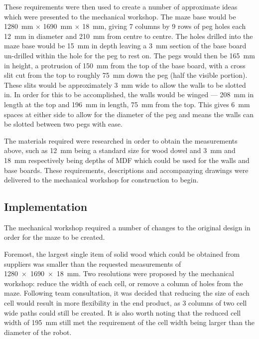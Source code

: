 These requirements were then used to create a number of approximate ideas which
were presented to the mechanical workshop. The maze base would be \SI{1280}{\mm}
$\times$ \SI{1690}{\mm} $\times$ \SI{18}{\mm}, giving 7 columns by 9 rows of
peg holes each \SI{12}{\mm} in diameter and \SI{210}{\mm} from centre to
centre. The holes drilled into the maze base would be \SI{15}{\mm} in depth
leaving a \SI{3}{\mm} section of the base board un-drilled within the hole for the peg to rest on. The pegs would then be
\SI{165}{\mm} in height, a protrusion of \SI{150}{\mm} from the top of the base board, with a cross slit cut from the top to
roughly \SI{75}{\mm} down the peg
(half the visible portion). These slits would be approximately \SI{3}{\mm} wide to allow the walls to be slotted in. In order for
this to be accomplished, the walls would be winged --- \SI{208}{\mm} in length at the top and \SI{196}{\mm} in length,
\SI{75}{\mm} from the top. This gives \SI{6}{\mm} spaces at either side to allow for the diameter of the peg and means the walls
can be slotted between two pegs with ease.

The materials required were researched in order to obtain the measurements
above, such as \SI{12}{\mm} being a standard size for wood dowel and \SI{3}{\mm}
and \SI{18}{\mm} respectively being depths of MDF which could be used for the
walls and base boards. These requirements, descriptions and accompanying
drawings were delivered to the mechanical workshop for construction to begin.

\subsection{Implementation}\label{test/maze/impl}
The mechanical workshop required a number of changes to the original design in
order for the maze to be created.

Foremost, the largest single item of solid wood which could be obtained from
suppliers was smaller than the requested measurements of \SI{1280 x 1690 x 18}
{\mm}. Two resolutions were proposed by the mechanical workshop: reduce
the width of each cell, or remove a column of holes from the maze. Following
team consultation, it was decided that reducing the size of each cell would
result in more flexibility in the end product, as 3 columns of two cell wide paths could still
be created. It is also worth noting that the reduced cell width of \SI{195}{\mm}
still met the requirement of the cell width being larger than the diameter of
the robot.


